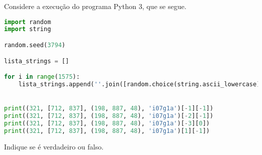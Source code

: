 \documentclass[12pt,varwidth=16cm,border=17pt]{standalone}
\begin{document}
Considere a execução do programa Python 3, que se segue. 

\begin{lstlisting}[language=Python]
import random
import string

random.seed(3794)

lista_strings = []

for i in range(1575):
	lista_strings.append(''.join([random.choice(string.ascii_lowercase) for i in range(7)]))


print((321, [712, 837], (198, 887, 48), 'i07g1a')[-1][-1])
print((321, [712, 837], (198, 887, 48), 'i07g1a')[-2][-1])
print((321, [712, 837], (198, 887, 48), 'i07g1a')[-3][0])
print((321, [712, 837], (198, 887, 48), 'i07g1a')[1][-1])
\end{lstlisting}

Indique se é verdadeiro ou falso.
\end{document}
